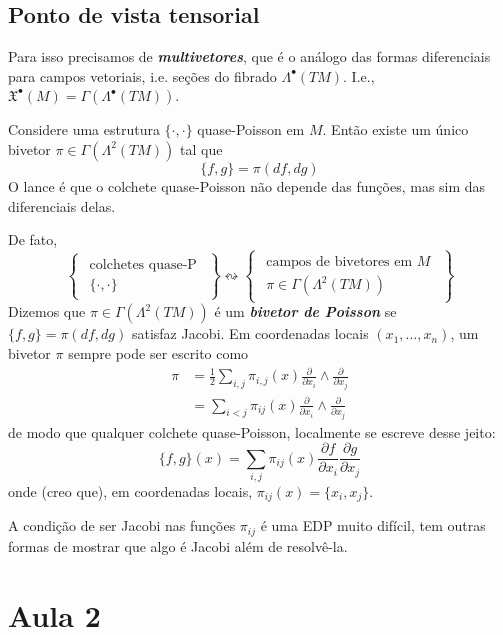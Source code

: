 \subsection{Ponto de vista tensorial}

Para isso precisamos de \textit{\textbf{multivetores}}, que é o análogo das formas diferenciais para campos vetoriais, i.e. seções do fibrado \(\Lambda^{\bullet}(TM)\). I.e., \(\mathfrak{X}^\bullet(M)=\Gamma(\Lambda^{\bullet}(TM))\).

Considere uma estrutura \(\{\cdot ,\cdot \}\) quase-Poisson em \(M\). Então existe um único bivetor \(\pi \in \Gamma(\Lambda^{2}(TM))\) tal que
\[\{f,g\}=\pi(df,dg)\]
O lance é que o colchete quase-Poisson não depende das funções, mas sim das diferenciais delas.

De fato,
\[\left\{ \substack{\begin{array}{c}\text{colchetes quase-P}  \\ \{\cdot ,\cdot \}\end{array}} \right\} \leftrightsquigarrow \left\{ \substack{\begin{array}{c}\text{campos de bivetores em \(M\)}  \\ \pi \in \Gamma(\Lambda^{2}(TM))\end{array}}\right\} \]
Dizemos que \(\pi \in \Gamma(\Lambda^{2}(TM))\) é um \textit{\textbf{bivetor de Poisson}} se \(\{f,g\}=\pi(df,dg)\) satisfaz Jacobi. Em coordenadas locais \((x_1,\ldots,x_n)\), um bivetor \(\pi\) sempre pode ser escrito como
\begin{align*}
\pi&=\frac{1}{2}\sum_{i,j}\pi_{i,j}(x) \frac{\partial }{\partial x_i}\wedge \frac{\partial }{\partial x_j}\\
&=\sum_{i<j}\pi_{ij}(x)\frac{\partial }{\partial x_i}\wedge\frac{\partial }{\partial x_j}
\end{align*}
de modo que qualquer colchete quase-Poisson, localmente se escreve desse jeito:
\[\{f,g\}(x)=\sum_{i,j}\pi_{ij}(x)\frac{\partial f}{\partial x_i}\frac{\partial g}{\partial x_j}\]
onde (creo que), em coordenadas locais, \(\pi_{ij}(x)=\{x_i,x_j\}\).
\begin{remark}\leavevmode
	A condição de ser Jacobi nas funções \(\pi_{ij}\) é uma EDP muito difícil, tem outras formas de mostrar que algo é Jacobi além de resolvê-la.
\end{remark}

\section{Aula 2}

